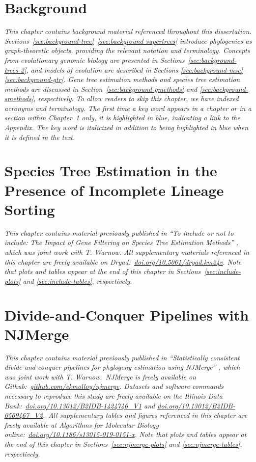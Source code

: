 \documentclass[tocnosub, noragright, centerchapter, fullpagesingle, 12pt]{uiuc_csthesis18}
\numberwithin{algocf}{chapter}
\theoremstyle{definition}
\begin{document}
\chapter{Background}
\label{chapter:background}
{\em This chapter contains background material referenced throughout this dissertation.
Sections~\ref{sec:background-tree}--\ref{sec:background-supertrees} introduce phylogenies as graph-theoretic objects, providing the relevant notation and terminology.
Concepts from evolutionary genomic biology are presented in Sections~\ref{sec:background-trees-2}, and models of evolution are described in Sections \ref{sec:background-msc}--\ref{sec:background-gtr}.
Gene tree estimation methods and species tree estimation methods are discussed in Section~\ref{sec:background-gmethods} and \ref{sec:background-smethods}, respectively.
To allow readers to skip this chapter, we have indexed acronyms and terminology.
The first time a key word appears in a chapter or in a section within Chapter~\ref{chapter:background} only, it is highlighted in blue, indicating a link to the Appendix.
The key word is italicized in addition to being highlighted in blue when it is defined in the text.}


\chapter{Species Tree Estimation in the Presence of Incomplete Lineage Sorting}
\label{chapter:include}
{\em This chapter contains material previously published in ``To include or not to include: The Impact of Gene Filtering on Species Tree Estimation Methods'' \cite{molloy2018include}, which was joint work with T. Warnow. 
All supplementary materials referenced in this chapter are freely available on Dryad:~\href{https://doi.org/10.5061/dryad.km24v}{doi.org/10.5061/dryad.km24v}.
Note that plots and tables appear at the end of this chapter in Sections~\ref{sec:include-plots} and \ref{sec:include-tables}, respectively.}


\chapter{Divide-and-Conquer Pipelines with NJMerge}
\label{chapter:njmerge}
\textit{This chapter contains material previously published in ``Statistically consistent divide-and-conquer pipelines for phylogeny estimation using NJMerge'' \cite{molloy2019statistically}, which was joint work with T. Warnow.~\emph{NJMerge} is freely available on Github:~\href{https://github.com/ekmolloy/njmerge}{github.com/ekmolloy/njmerge}.
Datasets and software commands necessary to reproduce this study are freely available on the Illinois Data Bank:~\href{https://doi.org/10.13012/B2IDB-1424746_V1}{doi.org/10.13012/B2IDB-1424746\_V1} and \href{https://doi.org/10.13012/B2IDB-0569467_V2}{doi.org/10.13012/B2IDB-0569467\_V2}.~All supplementary tables and figures referenced in this chapter are freely available at {\em Algorithms for Molecular Biology} online:~\href{https://doi.org/10.1186/s13015-019-0151-x}{doi.org/10.1186/s13015-019-0151-x}. 
Note that plots and tables appear at the end of this chapter in Sections~\ref{sec:njmerge-plots} and \ref{sec:njmerge-tables}, respectively.}

\end{document}
